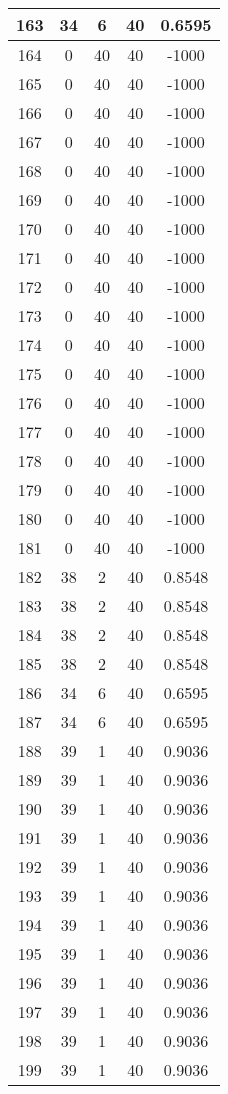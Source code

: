 \documentclass[letterpaper, 12pt]{article}
\begin{document}
\begin{longtable}{|c|c|c|c|c|}
\hline
163 & 34 & 6 & 40 & 0.6595 \\
\hline
164 & 0 & 40 & 40 & -1000 \\
\hline
165 & 0 & 40 & 40 & -1000 \\
\hline
166 & 0 & 40 & 40 & -1000 \\
\hline
167 & 0 & 40 & 40 & -1000 \\
\hline
168 & 0 & 40 & 40 & -1000 \\
\hline
169 & 0 & 40 & 40 & -1000 \\
\hline
170 & 0 & 40 & 40 & -1000 \\
\hline
171 & 0 & 40 & 40 & -1000 \\
\hline
172 & 0 & 40 & 40 & -1000 \\
\hline
173 & 0 & 40 & 40 & -1000 \\
\hline
174 & 0 & 40 & 40 & -1000 \\
\hline
175 & 0 & 40 & 40 & -1000 \\
\hline
176 & 0 & 40 & 40 & -1000 \\
\hline
177 & 0 & 40 & 40 & -1000 \\
\hline
178 & 0 & 40 & 40 & -1000 \\
\hline
179 & 0 & 40 & 40 & -1000 \\
\hline
180 & 0 & 40 & 40 & -1000 \\
\hline
181 & 0 & 40 & 40 & -1000 \\
\hline
182 & 38 & 2 & 40 & 0.8548 \\
\hline
183 & 38 & 2 & 40 & 0.8548 \\
\hline
184 & 38 & 2 & 40 & 0.8548 \\
\hline
185 & 38 & 2 & 40 & 0.8548 \\
\hline
186 & 34 & 6 & 40 & 0.6595 \\
\hline
187 & 34 & 6 & 40 & 0.6595 \\
\hline
188 & 39 & 1 & 40 & 0.9036 \\
\hline
189 & 39 & 1 & 40 & 0.9036 \\
\hline
190 & 39 & 1 & 40 & 0.9036 \\
\hline
191 & 39 & 1 & 40 & 0.9036 \\
\hline
192 & 39 & 1 & 40 & 0.9036 \\
\hline
193 & 39 & 1 & 40 & 0.9036 \\
\hline
194 & 39 & 1 & 40 & 0.9036 \\
\hline
195 & 39 & 1 & 40 & 0.9036 \\
\hline
196 & 39 & 1 & 40 & 0.9036 \\
\hline
197 & 39 & 1 & 40 & 0.9036 \\
\hline
198 & 39 & 1 & 40 & 0.9036 \\
\hline
199 & 39 & 1 & 40 & 0.9036 \\
\hline
\end{longtable}
\end{document}
